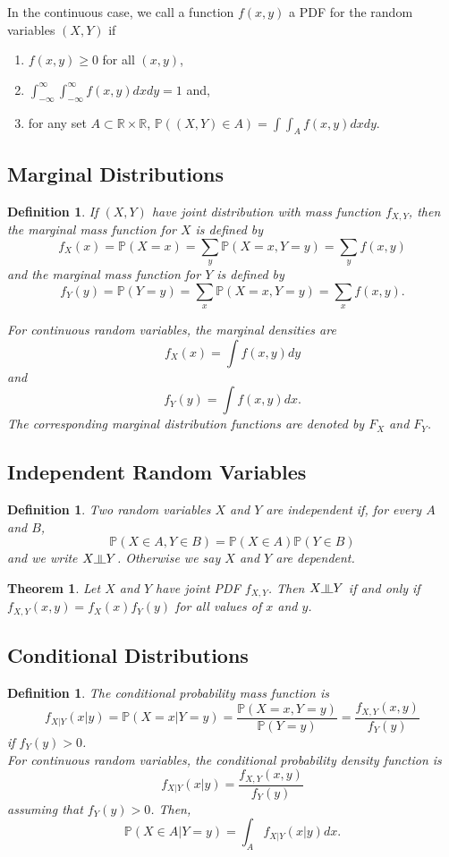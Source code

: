 \documentclass{article}
\newtheorem{theorem}[counter]{Theorem}
\newtheorem{definition}[counter]{Definition}
\theoremstyle{remark}
\newcommand{\1}{\mathbf{1}}
\newcommand{\Prob}{\mathbb{P}}
\newcommand{\R}{\mathbb{R}}
\newcommand{\indep}{\rotatebox[origin=c]{90}{$\models$}}
\begin{document}
\noindent In the continuous case, we call a function $f(x,y)$ a PDF for the random variables $(X,Y)$ if 
\begin{enumerate}
	\item $f(x,y) \geq 0$ for all $(x,y)$,
	\item $\int_{-\infty}^{\infty}\int_{-\infty}^{\infty} f(x,y) dxdy = 1$ and, 
	\item for any set $A \subset \R \times \R$, $\Prob((X,Y) \in A) = \int \int_A f(x,y)dxdy$.
\end{enumerate}

\subsection{Marginal Distributions}
\begin{definition}
	If $(X,Y)$ have joint distribution with mass function $f_{X,Y}$, then the marginal mass function for $X$ is defined by
	\[
	f_X(x) = \Prob(X=x) = \sum_y \Prob(X=x,Y=y) = \sum_y f(x,y)
	\]
	and the marginal mass function for $Y$ is defined by 
	\[
	f_Y(y) = \Prob(Y=y) = \sum_x \Prob(X=x,Y=y) = \sum_x f(x,y).
	\]
	
	\noindent For continuous random variables, the marginal densities are 
	\[
	f_X(x) = \int f(x,y)dy
	\]
	and 
	\[
	f_Y(y) = \int f(x,y)dx.
	\]
	The corresponding marginal distribution functions are denoted by $F_X$ and $F_Y$.
\end{definition}

\subsection{Independent Random Variables}
\begin{definition}
	Two random variables $X$ and $Y$ are independent if, for every $A$ and $B$,
	\[
	\Prob(X \in A, Y \in B) = \Prob(X \in A)\Prob(Y \in B)
	\]
	and we write $X \indep Y$. Otherwise we say $X$ and $Y$ are dependent.
\end{definition}

\begin{theorem}
	Let $X$ and $Y$ have joint PDF $f_{X,Y}$. Then $X \indep Y$ if and only if $f_{X,Y}(x,y) = f_X(x)f_Y(y)$ for all values of $x$ and $y$.
\end{theorem}

\subsection{Conditional Distributions}
\begin{definition}
	The conditional probability mass function is
	\[
	f_{X|Y}(x|y) = \Prob(X=x|Y=y) = \frac{\Prob(X=x,Y=y)}{\Prob(Y=y)} = \frac{f_{X,Y}(x,y)}{f_Y(y)}
	\]
	if $f_Y(y) > 0$. \\
	
	\noindent For continuous random variables, the conditional probability density function is
	\[
	f_{X|Y}(x|y) = \frac{f_{X,Y}(x,y)}{f_Y(y)}
	\]
	assuming that $f_Y(y) > 0$. Then,
	\[
	\Prob(X \in A|Y=y) = \int_A f_{X|Y}(x|y)dx.
	\]
\end{definition}
\end{document}
